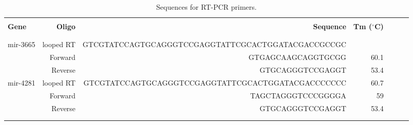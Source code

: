 \begin{table}
{\scriptsize
\caption{Sequences for RT-PCR primers.}
\begin{tabular}{lrrrlll}
\hline
& & & & & & \\
\textbf{Gene}	&	\textbf{Oligo}	&	\textbf{Sequence} &	\textbf{Tm ($^{\circ}$C)} \\
& & & & & &
\\
\hline
& & & & & &
\\
mir-3665	&	looped RT 	&	GTCGTATCCAGTGCAGGGTCCGAGGTATTCGCACTGGATACGACCGCCGC  &	{}\\
{}	&	Forward	&	GTGAGCAAGCAGGTGCGG	&	60.1	\\
{}	&	Reverse	&	GTGCAGGGTCCGAGGT	&	53.4	\\
mir-4281	&	looped RT 	&	GTCGTATCCAGTGCAGGGTCCGAGGTATTCGCACTGGATACGACCCCCCC  &	60.7\\
{}	&	Forward	&	TAGCTAGGGTCCCGGGGA	&	59\\
{}	&	Reverse	&	GTGCAGGGTCCGAGGT	&	53.4	\\

& & & & & &
\\
\hline & & & & & & \\
\end{tabular}
}
\label{tableSM:GEOdatasets}
\end{table}
